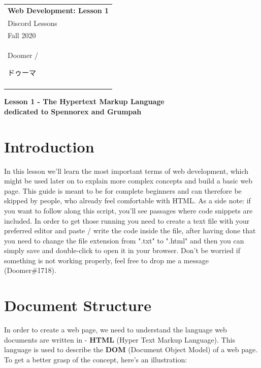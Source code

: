 \documentclass[a4paper,12pt]{article}
\newcommand{\selfjp}{\begin{CJK*}{UTF8}{min}ドゥーマ\end{CJK*}}
\begin{document}
\thispagestyle{empty} 

\begin{tabular}{p{15.5cm}} 
{\large \bf Web Development: Lesson 1} \\
Discord Lessons\\ Fall 2020\\ Doomer / \selfjp \\
\hline
\\
\end{tabular}

\vspace*{0.3cm}

\begin{center}
	{\Large \bf Lesson 1 - The Hypertext Markup Language}
	\vspace{2mm}\\
	{\bf dedicated to Spennorex and Grumpah}
		
\end{center}  

\vspace{0.4cm}

\section{Introduction}
In this lesson we'll learn the most important terms of web development, which might be used later on to explain more complex concepts and build a basic web page. This guide is meant to be for complete beginners and can therefore be skipped by people, who already feel comfortable with HTML. As a side note: if you want to follow along this script, you'll see passages where code snippets are included. In order to get those running you need to create a text file with your preferred editor and paste / write the code inside the file, after having done that you need to change the file extension from ".txt" to ".html" and then you can simply save and double-click to open it in your browser. Don't be worried if something is not working properly, feel free to drop me a message (Doomer\#1718).

\section{Document Structure}
In order to create a web page, we need to understand the language web documents are written in - \textbf{HTML} (Hyper Text Markup Language). This language is used to describe the \textbf{DOM} (Document Object Model) of a web page. To get a better grasp of the concept, here's an illustration:
\end{document}
